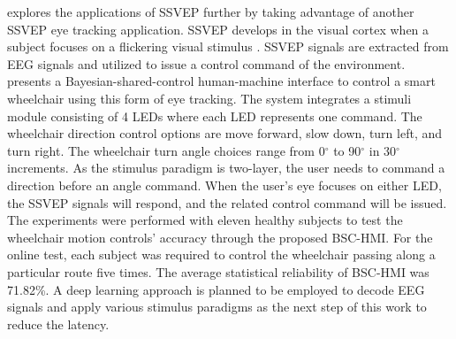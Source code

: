 \textcite{deng_bayesian_2020} explores the applications of SSVEP further by taking advantage of another SSVEP eye tracking application. SSVEP develops in the visual cortex when a subject focuses on a flickering visual stimulus \parencite{nakanishi_high-speed_2014}. SSVEP signals are extracted from EEG signals and utilized to issue a control command of the environment. \textcite{deng_bayesian_2020} presents a Bayesian-shared-control human-machine interface to control a smart wheelchair using this form of eye tracking. The system integrates a stimuli module consisting of 4 LEDs where each LED represents one command. The wheelchair direction control options are move forward, slow down, turn left, and turn right. The wheelchair turn angle choices range from 0$^{\circ}$ to  90$^{\circ}$ in 30$^{\circ}$ increments. As the stimulus paradigm is two-layer, the user needs to command a direction before an angle command. When the user's eye focuses on either LED, the SSVEP signals will respond, and the related control command will be issued. The experiments were performed with eleven healthy subjects to test the wheelchair motion controls'  accuracy through the proposed BSC-HMI. For the online test, each subject was required to control the wheelchair passing along a particular route five times. The average statistical reliability of BSC-HMI was 71.82\%.  A deep learning approach is planned to be employed to decode EEG signals and apply various stimulus paradigms as the next step of this work to reduce the latency.

